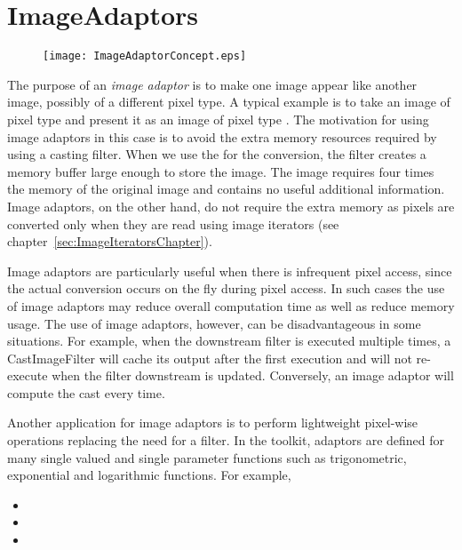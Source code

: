 
\chapter{ImageAdaptors}
\label{sec:ImageAdaptors}


\begin{figure}
\center
\texttt{[image: ImageAdaptorConcept.eps]}
\label{fig:ImageAdaptorConcept}
\end{figure}

The purpose of an \emph{image adaptor} is to make one image appear
like another image, possibly of a different pixel type.  A typical
example is to take an image of pixel type  and
present it as an image of pixel type . The motivation for
using image adaptors in this case is to avoid the extra memory
resources required by using a casting filter.  When we use the
 for the conversion, the filter creates a
memory buffer large enough to store the  image. The
 image requires four times the memory of the
original image and contains no useful additional information. Image
adaptors, on the other hand, do not require the extra memory as
pixels are converted only when they are read using image iterators
(see chapter~\ref{sec:ImageIteratorsChapter}).

Image adaptors are particularly useful when there is infrequent pixel
access, since the actual conversion occurs on the fly during pixel
access. In such cases the use of image adaptors may reduce overall
computation time as well as reduce memory usage. The use of image
adaptors, however, can be disadvantageous in some situations. For
example, when the downstream filter is executed multiple times, a
CastImageFilter will cache its output after the first execution and
will not re-execute when the filter downstream is updated. Conversely,
an image adaptor will compute the cast every time.

Another application for image adaptors is to perform lightweight
pixel-wise operations replacing the need for a filter. In the toolkit,
adaptors are defined for many single valued and single parameter
functions such as trigonometric, exponential and logarithmic
functions. For example,
\begin{itemize}
\item {}
\item {}
\item {}
\end{itemize}

